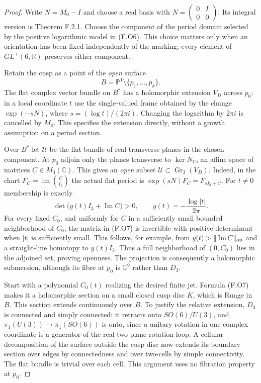 \begin{proof}
Write $N=M_0-I$ and choose a real basis with
$N=\left(\begin{smallmatrix}0&I\\0&0\end{smallmatrix}\right)$.
Its integral version is Theorem F.2.1.  Choose the component
of the period domain selected by the positive logarithmic
model in (F.O6).  This choice matters only when an orientation
has been fixed independently of the marking; every element
of $GL^+(6,\mathbb R)$ preserves either component.

Retain the cusp as a point of the \emph{open} surface
\[
 B=\mathbb P^1\setminus\{p_1,\ldots,p_k\}.
\]
The flat complex vector bundle on $B^*$ has a holomorphic
extension $V_D$ across $p_0$: in a local coordinate $t$ use
the single-valued frame obtained by the change
$\exp(-sN)$, where $s=(\log t)/(2\pi i)$.
Changing the logarithm by $2\pi i$ is cancelled by $M_0$.
This specifies the extension directly, without a growth
assumption on a period section.

Over $B^*$ let $\mathscr U$ be the flat bundle of real-transverse
planes in the chosen component.  At $p_0$ adjoin only the
planes transverse to $\ker N_\mathbb C$, an affine space of
matrices $C\in M_3(\mathbb C)$.  This gives an \emph{open}
subset $\mathscr U\subset\operatorname{Gr}_3(V_D)$.
Indeed, in the chart $F_C=\operatorname{im}\binom C{I_3}$
the actual flat period is
$\exp(sN)F_C=F_{sI_3+C}$.  For $t\ne0$ membership is exactly
\[
 \det\bigl(y(t)I_3+\operatorname{Im}C\bigr)>0,
 \qquad y(t)=-\frac{\log|t|}{2\pi}.
 \tag{F.O7}
\]
For every fixed $C_0$, and uniformly for $C$ in a sufficiently
small bounded neighborhood of $C_0$, the matrix in (F.O7) is
invertible with positive determinant when $|t|$ is sufficiently
small.  This follows, for example, from
$y(t)>\|\operatorname{Im}C\|_{\rm op}$ and a straight-line
homotopy to $y(t)I_3$.  Thus a full neighborhood of
$(0,C_0)$ lies in the adjoined set, proving openness.
The projection is consequently a holomorphic submersion,
although its fibre at $p_0$ is $\mathbb C^9$ rather than $D_3$.

Start with a polynomial $C_0(t)$ realizing the desired finite
jet.  Formula (F.O7) makes it a holomorphic section on a small
closed cusp disc $K$, which is Runge in $B$.
This section extends continuously over $B$.  To justify the
relative extension, $D_3$ is connected and simply connected:
it retracts onto $SO(6)/U(3)$, and
$\pi_1(U(3))\to\pi_1(SO(6))$ is onto, since a unitary rotation
in one complex coordinate is a generator of the real
two-plane rotation loop.  A cellular decomposition of the
surface outside the cusp disc now extends its boundary
section over edges by connectedness and over two-cells by
simple connectivity.  The flat bundle is trivial over each
cell.  This argument uses no fibration property at $p_0$.


\end{proof}
